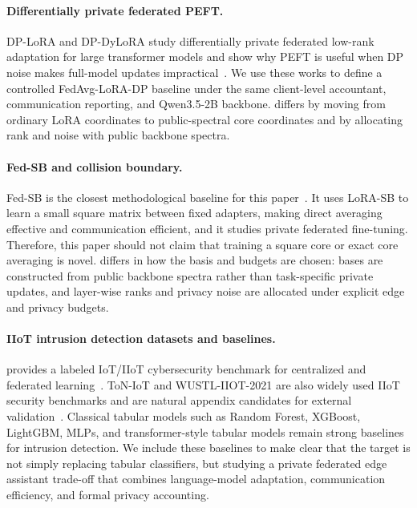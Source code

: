 \paragraph{Differentially private federated PEFT.}
DP-LoRA and DP-DyLoRA study differentially private federated low-rank adaptation for large transformer models and show why PEFT is useful when DP noise makes full-model updates impractical~\citep{liu2023dplora,xu2024dpdylora}. We use these works to define a controlled FedAvg-LoRA-DP baseline under the same client-level accountant, communication reporting, and Qwen3.5-2B backbone. \method differs by moving from ordinary LoRA coordinates to public-spectral core coordinates and by allocating rank and noise with public backbone spectra.

\paragraph{Fed-SB and collision boundary.}
Fed-SB is the closest methodological baseline for this paper~\citep{singhal2025fedsb}. It uses LoRA-SB to learn a small square matrix between fixed adapters, making direct averaging effective and communication efficient, and it studies private federated fine-tuning. Therefore, this paper should not claim that training a square core or exact core averaging is novel. \method differs in how the basis and budgets are chosen: bases are constructed from public backbone spectra rather than task-specific private updates, and layer-wise ranks and privacy noise are allocated under explicit edge and privacy budgets.

\paragraph{IIoT intrusion detection datasets and baselines.}
\dataset provides a labeled IoT/IIoT cybersecurity benchmark for centralized and federated learning~\citep{ferrag2022edgeiiotset}. ToN-IoT and WUSTL-IIOT-2021 are also widely used IIoT security benchmarks and are natural appendix candidates for external validation~\citep{alsaedi2020toniot,zolanvari2019iiot,wustl2021iiot}. Classical tabular models such as Random Forest, XGBoost, LightGBM, MLPs, and transformer-style tabular models remain strong baselines for intrusion detection. We include these baselines to make clear that the target is not simply replacing tabular classifiers, but studying a private federated edge assistant trade-off that combines language-model adaptation, communication efficiency, and formal privacy accounting.
